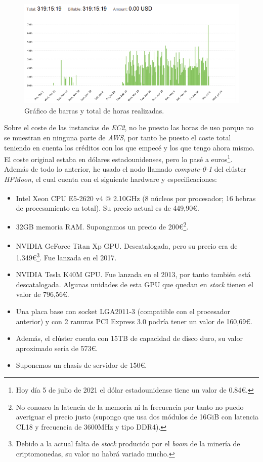 \begin{figure}[H]
  \centering
  \includegraphics[width=1.\linewidth]{imagenes/04_Planificacion/hours.png} 
  \caption{Gráfico de barras y total de horas realizadas.}
  \label{fig:hours}
\end{figure}

Sobre el coste de las instancias de \textit{EC2}, no he puesto las horas de uso porque no se muestran en ninguna parte de \textit{AWS}, por tanto he puesto el coste total teniendo en cuenta los créditos con los que empecé y los que tengo ahora mismo. El coste original estaba en dólares estadounidenses, pero lo pasé a euros\footnote{Hoy día 5 de julio de 2021 el dólar estadounidense tiene un valor de 0.84\euro.}.\\

Además de todo lo anterior, he usado el nodo llamado \textit{compute-0-1} del clúster \textit{HPMoon}, el cual cuenta con el siguiente hardware y especificaciones:

\begin{itemize}
    \item Intel\textsuperscript{\textregistered} Xeon\textsuperscript{\textregistered} CPU E5-2620 v4 @ 2.10GHz (8 núcleos por procesador; 16 hebras de procesamiento en total). Su precio actual es de 449,90\euro.
    \item 32GB memoria RAM. Supongamos un precio de 200\euro\footnote{No conozco la latencia de la memoria ni la frecuencia por tanto no puedo averiguar el precio justo (supongo que usa dos módulos de 16GiB con latencia CL18 y frecuencia de 3600MHz y tipo DDR4).}.
    \item NVIDIA GeForce\textsuperscript{\textregistered} Titan Xp GPU. Descatalogada, pero su precio era de 1.349\euro\footnote{Debido a la actual falta de \textit{stock} producido por el \textit{boom} de la minería de criptomonedas, su valor no habrá variado mucho.}. Fue lanzada en el 2017.
    \item NVIDIA Tesla K40M GPU. Fue lanzada en el 2013, por tanto también está descatalogada. Algunas unidades de esta GPU que quedan en \textit{stock} tienen el valor de 796,56\euro.
    \item Una placa base con socket LGA2011-3 (compatible con el procesador anterior) y con 2 ranuras PCI Express 3.0 podría tener un valor de 160,69\euro.
    \item Además, el clúster cuenta con 15TB de capacidad de disco duro, su valor aproximado sería de 573\euro.
    \item Suponemos un chasis de servidor de 150\euro.
\end{itemize}

